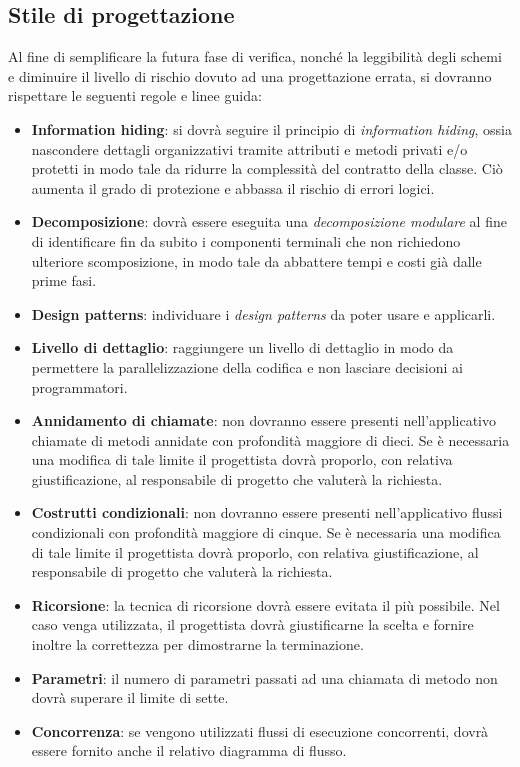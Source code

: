 {\subsection{Stile di progettazione}
Al fine di semplificare la futura fase di verifica, nonché la leggibilità degli schemi e diminuire il livello di rischio dovuto ad una progettazione errata, si dovranno rispettare le seguenti regole e linee guida:
\begin{itemize}
\item \textbf{Information hiding}: si dovrà seguire il principio di \textit{information hiding}, ossia nascondere dettagli organizzativi tramite attributi e metodi privati e/o protetti in modo tale da ridurre la complessità del contratto della classe. Ciò aumenta il grado di protezione e abbassa il rischio di errori logici.
\item \textbf{Decomposizione}: dovrà essere eseguita una \textit{decomposizione modulare} al fine di identificare fin da subito i componenti terminali che non richiedono ulteriore scomposizione, in modo tale da abbattere tempi e costi già dalle prime fasi.
\item \textbf{Design patterns}: individuare i \textit{design patterns} da poter usare e applicarli.
\item \textbf{Livello di dettaglio}: raggiungere un livello di dettaglio in modo da permettere la parallelizzazione della codifica e non lasciare decisioni ai programmatori. 

\item \textbf{Annidamento di chiamate}: non dovranno essere presenti nell'applicativo chiamate di metodi annidate con profondità maggiore di dieci. Se è necessaria una modifica di tale limite il progettista dovrà proporlo, con relativa giustificazione, al responsabile di progetto che valuterà la richiesta.
\item \textbf{Costrutti condizionali}: non dovranno essere presenti nell'applicativo flussi condizionali con profondità maggiore di cinque. Se è necessaria una modifica di tale limite il progettista dovrà proporlo, con relativa giustificazione, al responsabile di progetto che valuterà la richiesta.
\item \textbf{Ricorsione}: la tecnica di ricorsione dovrà essere evitata il più possibile. Nel caso venga utilizzata, il progettista dovrà giustificarne la scelta e fornire inoltre la correttezza per dimostrarne la terminazione.
\item \textbf{Parametri}: il numero di parametri passati ad una chiamata di metodo non dovrà superare il limite di sette.
\item \textbf{Concorrenza}: se vengono utilizzati flussi di esecuzione concorrenti, dovrà essere fornito anche il relativo diagramma di flusso.
\end{itemize}

}
